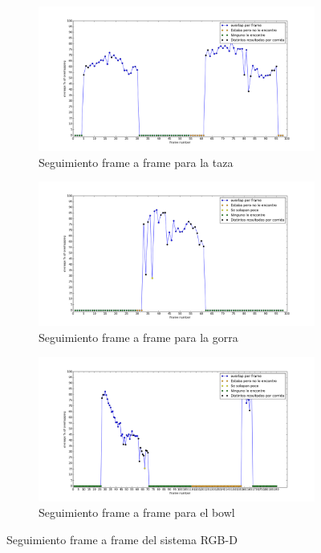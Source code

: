\begin{figure}
	\centering
	\begin{subfigure}[b]{0.9\textwidth}
		\includegraphics[width=\textwidth]{img/frame_a_frame/sistema-rgbd-taza.png}
		\caption{Seguimiento frame a frame para la taza}
		\label{frame_frame_sistema-rgb-d_taza}
	\end{subfigure}
	\quad
	\begin{subfigure}[b]{0.9\textwidth}
		\includegraphics[width=\textwidth]{img/frame_a_frame/sistema-rgbd-gorra.png}
		\caption{Seguimiento frame a frame para la gorra}
		\label{frame_frame_sistema-rgb-d_gorra}
	\end{subfigure}
	\quad
	\begin{subfigure}[b]{0.9\textwidth}
		\includegraphics[width=\textwidth]{img/frame_a_frame/sistema-rgbd-bowl.png}
		\caption{Seguimiento frame a frame para el bowl}
		\label{frame_frame_sistema-rgb-d_bowl}
	\end{subfigure}
	\caption{Seguimiento frame a frame del sistema RGB-D}
	\label{frame_frame_d}
\end{figure}

